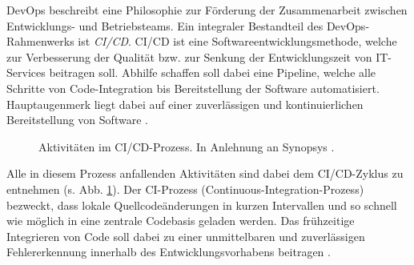 DevOps beschreibt eine Philosophie zur Förderung der Zusammenarbeit zwischen Entwicklungs- und Betriebsteams. Ein integraler Bestandteil des DevOps-Rahmen\-werks ist \textit{\ac{CI/CD}}. CI/CD ist eine Softwareentwicklungsmethode, welche zur Verbesserung der Qualität bzw. zur Senkung der Entwicklungszeit von IT-Services beitragen soll. Abhilfe schaffen soll dabei eine Pipeline, welche alle Schritte von Code-Integration bis Bereitstellung der Software automatisiert. Hauptaugenmerk liegt dabei auf einer zuverlässigen und kontinuierlichen Bereitstellung von Software \cite[471]{Zampetti.92720211012021}.
\begin{center}
	\begin{figure}[H]
		\centering
		\captionsetup{format=myformat}
		\caption[Aktivitäten im CI/CD-Prozess]{Aktivitäten im CI/CD-Prozess. In Anlehnung an Synopsys \cite{.20230201}.}
		\label{fig:CICD_Cycle}
	\end{figure}
\end{center}
\vspace*{-15mm}
Alle in diesem Prozess anfallenden Aktivitäten sind dabei dem CI/CD-Zyklus zu entnehmen (s. Abb. \ref*{fig:CICD_Cycle}). Der \acs{CI}-Prozess (Continuous-Integration-Prozess) bezweckt, dass lokale Quellcode\-änderungen in kurzen Intervallen und so schnell wie möglich in eine zentrale Codebasis geladen werden. Das frühzeitige Integrieren von Code soll dabei zu einer unmittelbaren und zuverlässigen Fehlererkennung innerhalb des Entwicklungsvorhabens beitragen \cite[471]{Zampetti.92720211012021}. 
